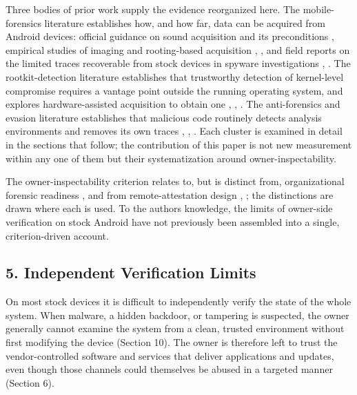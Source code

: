 \documentclass[
]{article}
\begin{document}
Three bodies of prior work supply the evidence reorganized here. The
mobile-forensics literature establishes how, and how far, data can be
acquired from Android devices: official guidance on sound acquisition
and its preconditions \citep{nist-sp800-101r1}, empirical studies of
imaging and rooting-based acquisition
\citep{son-android-data-integrity}, \citep{vidas-android-collection},
and field reports on the limited traces recoverable from stock devices
in spyware investigations \citep{amnesty-pegasus-methodology},
\citep{mvt-android-methodology}. The rootkit-detection literature
establishes that trustworthy detection of kernel-level compromise
requires a vantage point outside the running operating system, and
explores hardware-assisted acquisition to obtain one
\citep{guri-joker-jtag}, \citep{bickford-rootkits-smartphones},
\citep{brodbeck-covert-rootkit-detection}. The anti-forensics and
evasion literature establishes that malicious code routinely detects
analysis environments and removes its own traces
\citep{chen-anti-virtualization}, \citep{ruggia-evasive-malware},
\citep{garfinkel-anti-forensics}. Each cluster is examined in detail in
the sections that follow; the contribution of this paper is not new
measurement within any one of them but their systematization around
owner-inspectability.

The owner-inspectability criterion relates to, but is distinct from,
organizational forensic readiness \citep{rowlingson-forensic-readiness},
\citep{iso-27043} and from remote-attestation design
\citep{mayrhofer-android-security-model},
\citep{play-integrity-improvements}; the distinctions are drawn where
each is used. To the author\textquotesingle s knowledge, the limits of
owner-side verification on stock Android have not previously been
assembled into a single, criterion-driven account.

\subsection{5. Independent Verification
Limits}\label{independent-verification-limits}

On most stock devices it is difficult to independently verify the state
of the whole system. When malware, a hidden backdoor, or tampering is
suspected, the owner generally cannot examine the system from a clean,
trusted environment without first modifying the device (Section 10). The
owner is therefore left to trust the vendor-controlled software and
services that deliver applications and updates, even though those
channels could themselves be abused in a targeted manner (Section 6).
\end{document}
